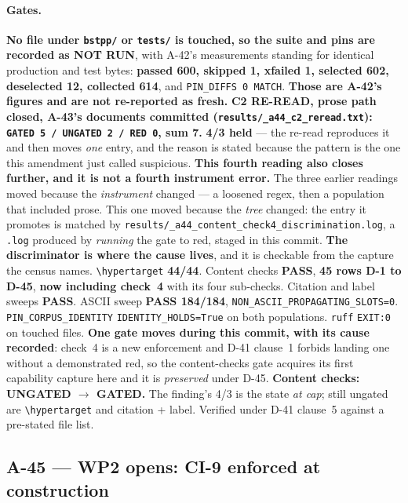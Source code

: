 \documentclass[
  10pt,
]{article}
\begin{document}
\paragraph{Gates.}
\textbf{No file under \texttt{bstpp/} or \texttt{tests/} is touched, so the suite and pins are recorded as NOT RUN}, with A-42's measurements standing for identical production and test bytes: \textbf{passed 600, skipped 1, xfailed 1, selected 602, deselected 12, collected 614}, and \texttt{PIN\_DIFFS 0 MATCH}. \textbf{Those are A-42's figures and are not re-reported as fresh.} \textbf{C2 RE-READ, prose path closed, A-43's documents committed (\texttt{results/\allowbreak{}\_a44\_c2\_reread.txt}): \texttt{GATED 5 / UNGATED 2 / RED 0}, sum 7.} \textbf{4/3 held} --- the re-read reproduces it and then moves \emph{one} entry, and the reason is stated because the pattern is the one this amendment just called suspicious. \textbf{This fourth reading also closes further, and it is not a fourth instrument error.} The three earlier readings moved because the \emph{instrument} changed --- a loosened regex, then a population that included prose. This one moved because the \emph{tree} changed: the entry it promotes is matched by \texttt{results/\allowbreak{}\_a44\_content\_check4\_discrimination.log}, a \texttt{.log} produced by \emph{running} the gate to red, staged in this commit. \textbf{The discriminator is where the cause lives}, and it is checkable from the capture the census names. \texttt{\textbackslash hypertarget} \textbf{44/44}. Content checks \textbf{PASS}, \textbf{45 rows D-1 to D-45}, \textbf{now including check~4} with its four sub-checks. Citation and label sweeps \textbf{PASS}. ASCII sweep \textbf{PASS 184/184}, \texttt{NON\_ASCII\_PROPAGATING\_SLOTS=0}. \texttt{PIN\_CORPUS\_IDENTITY} \texttt{IDENTITY\_HOLDS=True} on both populations. \texttt{ruff} \texttt{EXIT:0} on touched files. \textbf{One gate moves during this commit, with its cause recorded}: check~4 is a new enforcement and D-41 clause~1 forbids landing one without a demonstrated red, so the content-checks gate acquires its first capability capture here and it is \emph{preserved} under D-45. \textbf{Content checks: UNGATED $\rightarrow$ GATED.} The finding's 4/3 is the state \emph{at cap}; still ungated are \texttt{\textbackslash hypertarget} and citation + label. Verified under D-41 clause~5 against a pre-stated file list.

\hypertarget{a-45}{%
\subsection{A-45 --- WP2 opens: CI-9 enforced at construction}\label{a-45}}
\end{document}
